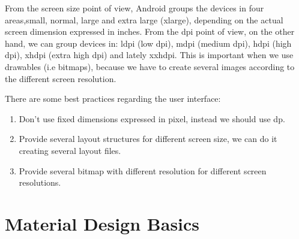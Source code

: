 From the screen size point of view, Android groups the devices in four areas,small, normal, large and extra large (xlarge),
depending on the actual screen dimension expressed in inches. From the dpi point of view, on the other hand, we can group
devices in: ldpi (low dpi), mdpi (medium dpi), hdpi (high dpi), xhdpi (extra high dpi) and lately xxhdpi. This is important when
we use drawables (i.e bitmaps), because we have to create several images according to the different screen resolution.

There are some best practices regarding the user interface:

\begin{framed}
	
	
	\begin{enumerate}
		\item Don’t use fixed dimensions expressed in pixel, instead we should use dp.
		\item Provide several layout structures for different screen size, we can do it creating several layout files.
		\item Provide several bitmap with different resolution for different screen resolutions. 
	\end{enumerate}

\end{framed}

\section{Material Design Basics}
